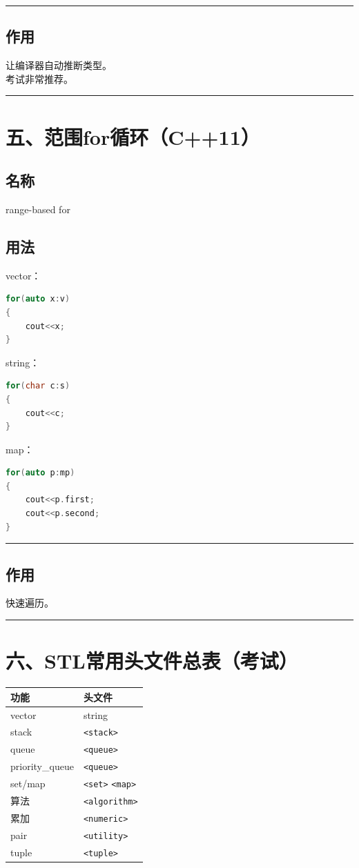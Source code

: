 \documentclass[10pt,twocolumn]{extarticle}
\begin{document}
\noindent\rule{\linewidth}{0.4pt}

\subsection{作用}
让编译器自动推断类型。\\
考试非常推荐。

\noindent\rule{\linewidth}{0.4pt}

\section{五、范围for循环（C++11）}

\subsection{名称}
range-based for

\subsection{用法}
vector：
\begin{lstlisting}[language=C++]
for(auto x:v)
{
    cout<<x;
}
\end{lstlisting}
string：
\begin{lstlisting}[language=C++]
for(char c:s)
{
    cout<<c;
}
\end{lstlisting}
map：
\begin{lstlisting}[language=C++]
for(auto p:mp)
{
    cout<<p.first;
    cout<<p.second;
}
\end{lstlisting}

\noindent\rule{\linewidth}{0.4pt}

\subsection{作用}
快速遍历。

\noindent\rule{\linewidth}{0.4pt}

\section{六、STL常用头文件总表（考试）}

\begin{table}[h]
\centering
\begin{tabular}{|l|l|}
\hline
功能 & 头文件 \\ \hline
vector & string \\ \hline
stack & \texttt{<stack>} \\ \hline
queue & \texttt{<queue>} \\ \hline
priority\_queue & \texttt{<queue>} \\ \hline
set/map & \texttt{<set>} \texttt{<map>} \\ \hline
算法 & \texttt{<algorithm>} \\ \hline
累加 & \texttt{<numeric>} \\ \hline
pair & \texttt{<utility>} \\ \hline
tuple & \texttt{<tuple>} \\ \hline
\end{tabular}
\end{table}
\end{document}
